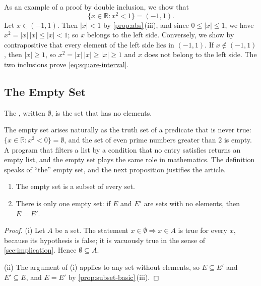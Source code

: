 As an example of a proof by double inclusion, we show that
\begin{equation}
\{x\in\mathbb R: x^2<1\}=(-1,1).
\label{eq:square-interval}
\end{equation}
Let $x\in(-1,1)$. Then $|x|<1$ by \cref{prop:abs}\,(iii), and since $0\le|x|\le1$, we have $x^2=|x|\,|x|\le|x|<1$; so $x$ belongs to the left side. Conversely, we show by contrapositive that every element of the left side lies in $(-1,1)$. If $x\notin(-1,1)$, then $|x|\ge1$, so $x^2=|x|\,|x|\ge|x|\ge1$ and $x$ does not belong to the left side. The two inclusions prove \eqref{eq:square-interval}.

\subsection{The Empty Set}

\begin{definition}
\label{def:empty-set}
The , written $\emptyset$, is the set that has no elements.
\end{definition}

The empty set arises naturally as the truth set of a predicate that is never true: $\{x\in\mathbb R: x^2<0\}=\emptyset$, and the set of even prime numbers greater than $2$ is empty. A program that filters a list by a condition that no entry satisfies returns an empty list, and the empty set plays the same role in mathematics. The definition speaks of ``the'' empty set, and the next proposition justifies the article.

\begin{proposition}
\label{prop:empty-set}
\leavevmode
\begin{enumerate}
\item The empty set is a subset of every set.
\item There is only one empty set: if $E$ and $E'$ are sets with no elements, then $E=E'$.
\end{enumerate}
\end{proposition}

\begin{proof}
(i) Let $A$ be a set. The statement $x\in\emptyset\Rightarrow x\in A$ is true for every $x$, because its hypothesis is false; it is vacuously true in the sense of \cref{sec:implication}. Hence $\emptyset\subseteq A$.

(ii) The argument of (i) applies to any set without elements, so $E\subseteq E'$ and $E'\subseteq E$, and $E=E'$ by \cref{prop:subset-basic}\,(iii).
\end{proof}


